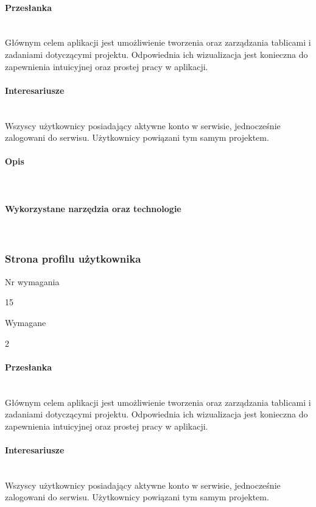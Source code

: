 \documentclass[eng,printmode]{mgr}
\begin{document}
\paragraph{Przesłanka}\ \\
Głównym celem aplikacji jest umożliwienie tworzenia oraz zarządzania tablicami i zadaniami dotyczącymi projektu. Odpowiednia ich wizualizacja jest konieczna do zapewnienia intuicyjnej oraz prostej pracy w aplikacji.

\paragraph{Interesariusze}\ \\
Wszyscy użytkownicy posiadający aktywne konto w serwisie, jednocześnie zalogowani do serwisu. Użytkownicy powiązani tym samym projektem.

\paragraph{Opis}\ \\

\paragraph{Wykorzystane narzędzia oraz technologie}\ \\
\newpage

\subsubsection{Strona profilu użytkownika}
\begin{labeling}{Nr wymagania}
\item [Nr wymagania:] 15
\item [Typ:] Wymagane
\item [Powiązania:] 2
\end{labeling}

\paragraph{Przesłanka}\ \\
Głównym celem aplikacji jest umożliwienie tworzenia oraz zarządzania tablicami i zadaniami dotyczącymi projektu. Odpowiednia ich wizualizacja jest konieczna do zapewnienia intuicyjnej oraz prostej pracy w aplikacji.

\paragraph{Interesariusze}\ \\
Wszyscy użytkownicy posiadający aktywne konto w serwisie, jednocześnie zalogowani do serwisu. Użytkownicy powiązani tym samym projektem.
\end{document}
